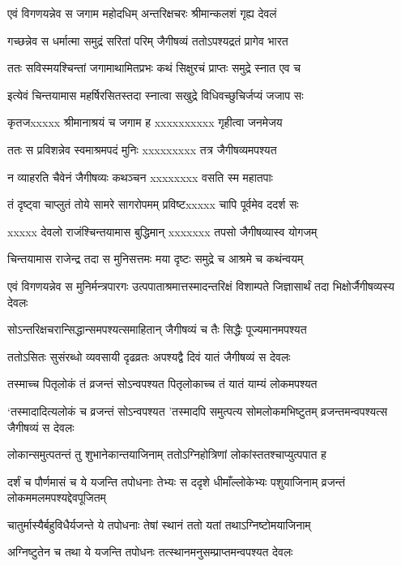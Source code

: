 \twolineshloka
{एवं विगणयन्नेव स जगाम महोदधिम्}
{अन्तरिक्षचरः श्रीमान्कलशं गृह्य देवलं}


\twolineshloka
{गच्छन्नेव स धर्मात्मा समुद्रं सरितां परिम्}
{जैगीषव्यं ततोऽपश्यद्रतं प्रागेव भारत}


\twolineshloka
{ततः सविस्मयश्चिन्तां जगामाथामितप्रभः}
{कथं सिक्षुरचं प्राप्तः समुद्रे स्नात एव च}


\twolineshloka
{इत्येवं चिन्तयामास महर्षिरसितस्तदा}
{स्नात्वा सखुद्रे विधिवच्छुचिर्जप्यं जजाप सः}


\twolineshloka
{कृतजxxxxx श्रीमानाश्रयं च जगाम ह}
{xxxxxxxxxx गृहीत्वा जनमेजय}


\twolineshloka
{ततः स प्रविशन्नेव स्वमाश्रमपदं मुनिः}
{xxxxxxxxx तत्र जैगीषव्यमपश्यत}


\twolineshloka
{न व्याहरति चैवेनं जैगीषव्यः कथञ्चन}
{xxxxxxxx वसति स्म महातपाः}


\twolineshloka
{तं दृष्ट्वा चाप्लुतं तोये सामरे सागरोपमम्}
{प्रविष्टxxxxx चापि पूर्वमेव ददर्श सः}


\twolineshloka
{xxxxx देवलो राजंश्चिन्तयामास बुद्धिमान्}
{xxxxxxx तपसो जैगीषव्यास्व योगजम्}


\twolineshloka
{चिन्तयामास राजेन्द्र तदा स मुनिसत्तमः}
{मया दृष्टः समुद्रे च आश्रमे च कथंन्वयम्}


\threelineshloka
{एवं विगणयन्नेव स मुनिर्मन्त्रपारगः}
{उत्पपाताश्रमात्तस्मादन्तरिक्षं विशाम्पते}
{जिज्ञासार्थं तदा भिक्षोर्जैगीषव्यस्य देवलः}


\twolineshloka
{सोऽन्तरिक्षचरान्सिद्धान्समपश्यत्समाहितान्}
{जैगीषव्यं च तैः सिद्धैः पूज्यमानमपश्यत}


\twolineshloka
{ततोऽसितः सुसंरब्धो व्यवसायी दृढव्रतः}
{अपश्यद्वै दिवं यातं जैगीषव्यं स देवलः}


\twolineshloka
{तस्माच्च पितृलोकं तं व्रजन्तं सोऽन्वपश्यत}
{पितृलोकाच्च तं यातं याम्यं लोकमपश्यत}


\threelineshloka
{`तस्मादादित्यलोकं च व्रजन्तं सोऽन्वपश्यत}
{'तस्मादपि समुत्पत्य सोमलोकमभिष्टुतम्}
{व्रजन्तमन्वपश्यत्स जैगीषव्यं स देवलः}


\twolineshloka
{लोकान्समुत्पतन्तं तु शुभानेकान्तयाजिनाम्}
{ततोऽग्निहोत्रिणां लोकांस्ततश्चाप्युत्पपात ह}


\threelineshloka
{दर्शं च पौर्णमासं च ये यजन्ति तपोधनाः}
{तेभ्यः स ददृशे धीमाँल्लोकेभ्यः पशुयाजिनाम्}
{व्रजन्तं लोकममलमपश्यद्देवपूजितम्}


\twolineshloka
{चातुर्मास्यैर्बहुविधैर्यजन्ते ये तपोधनाः}
{तेषां स्थानं ततो यतां तथाऽग्निष्टोमयाजिनाम्}


\twolineshloka
{अग्निष्टुतेन च तथा ये यजन्ति तपोधनः}
{तत्स्थानमनुसम्प्राप्तमन्वपश्यत देवलः}


